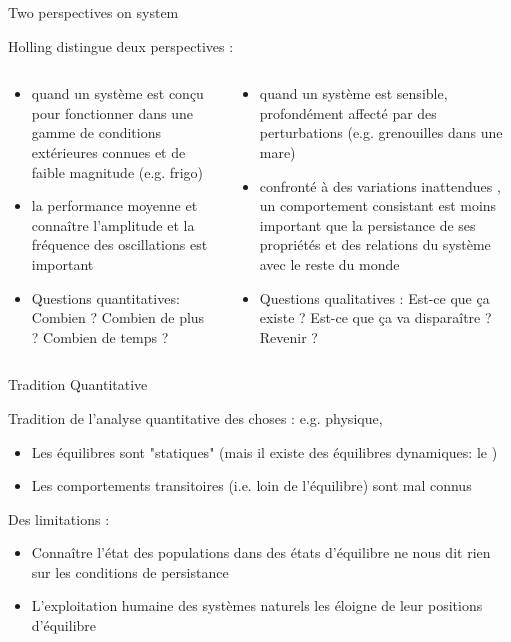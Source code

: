 \documentclass[11,aspectratio=1610]{beamer}
\begin{document}
\begin{frame}{Two perspectives on system}

Holling distingue deux  perspectives : 

\vspace{1cm}

\begin{scriptsize}
\begin{columns}
          \begin{column}{0.5\textwidth}
\begin{itemize}
\item quand un système est conçu pour fonctionner \alert{dans une gamme de conditions extérieures} connues et de faible magnitude  (e.g. frigo) 
\item \alert{la performance moyenne } et  connaître l'amplitude et la fréquence des oscillations est important
\item Questions \alert{quantitatives}: Combien ? Combien de plus ? Combien de temps ? 
\end{itemize}      
\end{column}
\vrule
\begin{column}{0.5\textwidth}
\begin{itemize}
\item quand un système est sensible, profondément affecté par des perturbations (e.g. grenouilles dans une mare)
\item confronté à des  \alert{variations inattendues} , un comportement consistant est \alert{moins important}  que la persistance de ses propriétés et des relations du système avec le reste du monde
\item Questions \alert{qualitatives} : Est-ce que ça existe ?  Est-ce que ça va disparaître ?  Revenir ? 
\end{itemize}
\end{column}
\end{columns}
\end{scriptsize}

\end{frame}




\begin{frame}{Tradition Quantitative}


Tradition de l'analyse  \alert{quantitative} des choses : e.g. physique,  

  \vfill

\begin{itemize}
  \item   Les équilibres sont "statiques"   (mais il existe des équilibres dynamiques: le )
  \item  Les comportements \alert{transitoires}  (i.e. loin de l'équilibre) sont mal connus 
  \end{itemize}
  \vfill
  Des limitations : 
  \begin{itemize}
  \item  Connaître l'état des populations dans des états d'équilibre  ne nous dit rien sur les conditions  de persistance
  \item  L'exploitation humaine des systèmes naturels les \alert{éloigne}  de leur positions d'équilibre
\end{itemize}
\end{frame}
  
\end{document}
